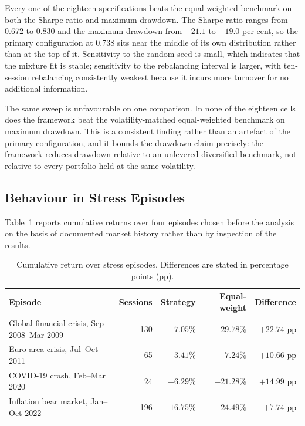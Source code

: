 Every one of the eighteen specifications beats the equal-weighted benchmark on both the
Sharpe ratio and maximum drawdown. The Sharpe ratio ranges from 0.672 to 0.830 and the
maximum drawdown from $-21.1$ to $-19.0$ per cent, so the primary configuration at
0.738 sits near the middle of its own distribution rather than at the top of it.
Sensitivity to the random seed is small, which indicates that the mixture fit is stable;
sensitivity to the rebalancing interval is larger, with ten-session rebalancing
consistently weakest because it incurs more turnover for no additional information.

The same sweep is unfavourable on one comparison. In none of the eighteen cells does
the framework beat the volatility-matched equal-weighted benchmark on maximum drawdown.
This is a consistent finding rather than an artefact of the primary configuration, and
it bounds the drawdown claim precisely: the framework reduces drawdown relative to an
unlevered diversified benchmark, not relative to every portfolio held at the same
volatility.

\subsection{Behaviour in Stress Episodes}

Table~\ref{tab:episodes} reports cumulative returns over four episodes chosen before the analysis on the
basis of documented market history rather than by inspection of the results.

\begin{table}[!ht]
\centering
\caption{Cumulative return over stress episodes. Differences are stated in percentage
points (pp).}
\label{tab:episodes}
\small
\begin{tabular}{p{3.6cm}rrrr}
\hline
\textbf{Episode} & \textbf{Sessions} & \textbf{Strategy} & \textbf{Equal-weight} & \textbf{Difference} \\
\hline
Global financial crisis, Sep 2008--Mar 2009 & 130 & $-7.05$\% & $-29.78$\% & $+22.74$ pp \\
Euro area crisis, Jul--Oct 2011 & 65 & $+3.41$\% & $-7.24$\% & $+10.66$ pp \\
COVID-19 crash, Feb--Mar 2020 & 24 & $-6.29$\% & $-21.28$\% & $+14.99$ pp \\
Inflation bear market, Jan--Oct 2022 & 196 & $-16.75$\% & $-24.49$\% & $+7.74$ pp \\
\hline
\end{tabular}
\end{table}

